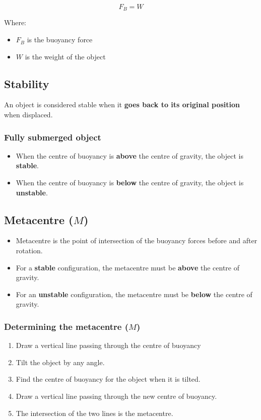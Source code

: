 \documentclass[11pt]{article}
\begin{document}
\[F_B = W\]

Where:
\begin{itemize}
\item \(F_B\) is the buoyancy force
\item \(W\) is the weight of the object
\end{itemize}

\subsection{Stability}
\label{sec:org51875fc}
An object is considered stable when it \textbf{goes back to its original position} when displaced.

\subsubsection{Fully submerged object}
\label{sec:orgdad1fa7}
\begin{itemize}
\item When the centre of buoyancy is \textbf{above} the centre of gravity, the object is \textbf{stable}.
\item When the centre of buoyancy is \textbf{below} the centre of gravity, the object is \textbf{unstable}.
\end{itemize}

\subsection{Metacentre (\(M\))}
\label{sec:org92f6815}
\begin{itemize}
\item Metacentre is the point of intersection of the buoyancy forces before and after rotation.
\item For a \textbf{stable} configuration, the metacentre must be \textbf{above} the centre of gravity.
\item For an \textbf{unstable} configuration, the metacentre must be \textbf{below} the centre of gravity.
\end{itemize}

\subsubsection{Determining the metacentre (\(M\))}
\label{sec:org10e7da7}
\begin{enumerate}
\item Draw a vertical line passing through the centre of buoyancy
\item Tilt the object by any angle.
\item Find the centre of buoyancy for the object when it is tilted.
\item Draw a vertical line passing through the new centre of buoyancy.
\item The intersection of the two lines is the metacentre.
\end{enumerate}
\end{document}

